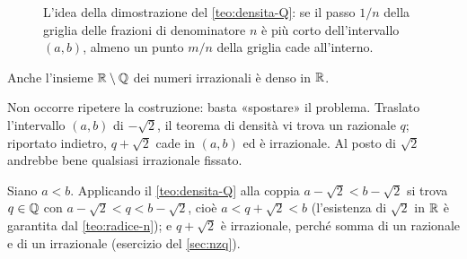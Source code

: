 \begin{figure}[htb]
\centering
{}
\caption{L'idea della dimostrazione del \cref{teo:densita-Q}: se il passo $1/n$ della
griglia delle frazioni di denominatore $n$ è più corto dell'intervallo $(a,b)$, almeno
un punto $m/n$ della griglia cade all'interno.}
\label{fig:densita-Q}
\end{figure}

\begin{corollario}\label{cor:densita-irrazionali}
Anche l'insieme $\mathbb{R}\setminus\mathbb{Q}$ dei numeri irrazionali è denso in $\mathbb{R}$.
\end{corollario}

\begin{schema}
\end{schema}

\begin{strategia}
Non occorre ripetere la costruzione: basta «spostare» il problema. Traslato
l'intervallo $(a,b)$ di $-\sqrt2$, il teorema di densità vi trova un razionale $q$;
riportato indietro, $q+\sqrt2$ cade in $(a,b)$ ed è irrazionale. Al posto di $\sqrt2$
andrebbe bene qualsiasi irrazionale fissato.
\end{strategia}

\begin{dimostrazione}
Siano $a<b$. Applicando il \cref{teo:densita-Q} alla coppia $a-\sqrt2<b-\sqrt2$ si trova
$q\in\mathbb{Q}$ con $a-\sqrt2<q<b-\sqrt2$, cioè $a<q+\sqrt2<b$ (l'esistenza di $\sqrt2$ in
$\mathbb{R}$ è garantita dal \cref{teo:radice-n}); e $q+\sqrt2$ è irrazionale,
perché somma di un razionale e di un irrazionale (esercizio del \cref{sec:nzq}).
\end{dimostrazione}

